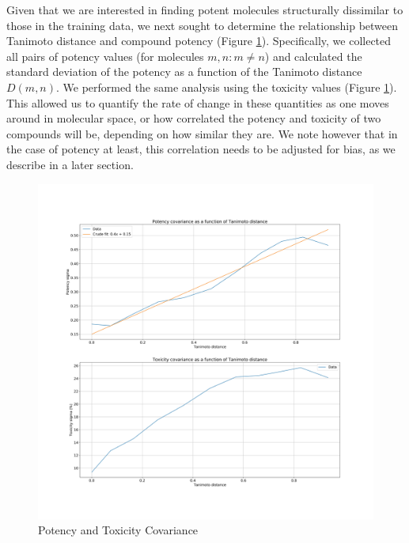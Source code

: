 \documentclass[journal=jacsat,manuscript=article]{achemso}
\begin{document}
\newline
\newline
Given that we are interested in finding potent molecules structurally dissimilar to those in the training data, we next sought to determine the relationship between Tanimoto distance and compound potency (Figure \ref{fig:cov}). Specifically, we collected all pairs of potency values (for molecules $m, n: m \neq n$) and calculated the standard deviation of the potency %
as a function of the Tanimoto distance $D(m, n)$. We performed the same analysis using the toxicity values (Figure \ref{fig:cov}).
This allowed us to quantify the rate of change in these quantities as one moves around in molecular space, or how correlated the potency and toxicity of two compounds will be, depending on how similar they are. We note however that in the case of potency at least, this correlation needs to be adjusted for bias, as we describe in a later section.

\begin{figure}[h!]
\centering
\includegraphics[width=\textwidth]{fig3_covariance.jpg}
\caption{Potency and Toxicity Covariance}
\label{fig:cov}
\end{figure}
\end{document}
